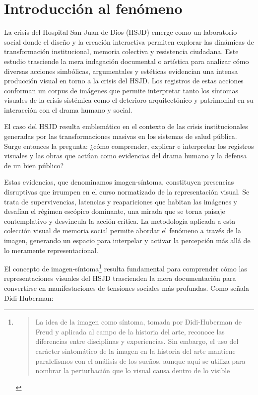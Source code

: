 \section*{Introducción al fenómeno}

La crisis del Hospital San Juan de Dios (HSJD) emerge como un laboratorio social donde el diseño y la creación interactiva permiten explorar las dinámicas de transformación institucional, memoria colectiva y resistencia ciudadana. Este estudio trasciende la mera indagación documental o artística para analizar cómo diversas acciones simbólicas, argumentales y estéticas evidencian una intensa producción visual en torno a la crisis del HSJD. Los registros de estas acciones conforman un corpus de imágenes que permite interpretar tanto los síntomas visuales de la crisis sistémica como el deterioro arquitectónico y patrimonial en su interacción con el drama humano y social.

El caso del HSJD resulta emblemático en el contexto de las crisis institucionales generadas por las transformaciones masivas en los sistemas de salud pública. Surge entonces la pregunta: ¿cómo comprender, explicar e interpretar los registros visuales y las obras que actúan como evidencias del drama humano y la defensa de un bien público?

\textcolor{edit30sept}{Estas evidencias, que denominamos imagen-síntoma, constituyen presencias disruptivas que irrumpen en el curso normatizado de la representación visual. Se trata de supervivencias, latencias y reapariciones que habitan las imágenes y desafían el régimen escópico dominante, una mirada que se torna paisaje contemplativo y desvincula la acción crítica. La metodología aplicada a esta colección visual de memoria social permite abordar el fenómeno a través de la imagen, generando un espacio para interpelar y activar la percepción más allá de lo meramente representacional.}

El concepto de imagen-síntoma\footnote{\begin{quote}La idea de la imagen como síntoma, tomada por Didi-Huberman de Freud y aplicada al campo de la historia del arte, reconoce las diferencias entre disciplinas y experiencias. Sin embargo, el uso del carácter sintomático de la imagen en la historia del arte mantiene paralelismos con el análisis de los sueños, aunque aquí se utiliza para nombrar la perturbación que lo visual causa dentro de lo visible \parencite[p. 37]{VegaArevalo2017}\end{quote}} resulta fundamental para comprender cómo las representaciones visuales del HSJD trascienden la mera documentación para convertirse en manifestaciones de tensiones sociales más profundas. Como señala Didi-Huberman:

